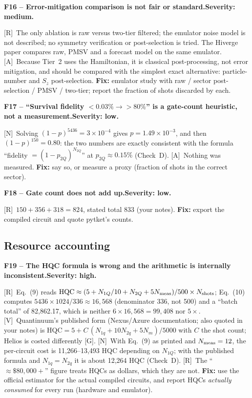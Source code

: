 \documentclass[11pt,a4paper]{article}
\newcommand{\lR}{\textcolor{keyblue}{[R]}}   %
\newcommand{\lV}{\textcolor{keyblue}{[V]}}   %
\newcommand{\lA}{\textcolor{notegray}{[A]}}  %
\newcommand{\lG}{\textcolor{alertred}{[G]}}  %
\newcommand{\lN}{\textcolor{keyblue}{[N]}}   %
\newcommand{\sev}[1]{\textbf{Severity: #1.}}
\newcommand{\flaw}[4]{\par\medskip\noindent\textbf{#1 -- #2.}\quad{\small\textcolor{notegray}{Where: #3.}}\quad\sev{#4}\par\nobreak}
\begin{document}
\flaw{F16}{Error-mitigation comparison is not fair or standard}{p.~9, Sec.~3.5; p.~10}{medium}
\lR\ The only ablation is raw versus two-tier filtered; the emulator noise model is not described; no symmetry verification or post-selection is tried. The Hiverge paper compares raw, PMSV and a forecast model on the same emulator. \lA\ Because Tier~2 uses the Hamiltonian, it is classical post-processing, not error mitigation, and should be compared with the simplest exact alternative: particle-number and $S_z$ post-selection. \textbf{Fix:} emulator study with raw / sector post-selection / PMSV / two-tier; report the fraction of shots discarded by each.

\flaw{F17}{``Survival fidelity $<0.03\%\to>80\%$'' is a gate-count heuristic, not a measurement}{abstract; p.~8; p.~13}{low}
\lN\ Solving $(1-p)^{5436}=3\times10^{-4}$ gives $p=1.49\times10^{-3}$, and then $(1-p)^{150}=0.80$: the two numbers are exactly consistent with the formula ``fidelity $=(1-p_{2Q})^{N_{2Q}}$'' at $p_{2Q}\approx0.15\%$ (Check~D). \lA\ Nothing was measured. \textbf{Fix:} say so, or measure a proxy (fraction of shots in the correct sector).

\flaw{F18}{Gate count does not add up}{p.~9, Sec.~4.1}{low}
\lR\ $150+356+318=824$, stated total 833 (your notes). \textbf{Fix:} export the compiled circuit and quote pytket's counts.

\subsection{Resource accounting}

\flaw{F19}{The HQC formula is wrong and the arithmetic is internally inconsistent}{p.~5, Eqs.~(9)--(10)}{high}
\lR\ Eq.~(9) reads $\mathrm{HQC}\approx(5+N_{1Q}/10+N_{2Q}+5N_{\rm meas})/500\times N_{\rm shots}$; Eq.~(10) computes $5436\times1024/336\approx16{,}568$ (denominator 336, not 500) and a ``batch total'' of 82,862.17, which is neither $6\times16{,}568=99{,}408$ nor $5\times$. \lV\ Quantinuum's published form (Nexus/Azure documentation; also quoted in your notes) is $\mathrm{HQC}=5+C\,(N_{1q}+10N_{2q}+5N_m)/5000$ with $C$ the shot count; Helios is costed differently \lG. \lN\ With Eq.~(9) as printed and $N_{\rm meas}=12$, the per-circuit cost is 11,266--13,493 HQC depending on $N_{1Q}$; with the published formula and $N_{1q}=N_{2q}$ it is about 12,264 HQC (Check~D). \lR\ The ``$\approx\$80{,}000+$'' figure treats HQCs as dollars, which they are not. \textbf{Fix:} use the official estimator for the actual compiled circuits, and report HQCs \emph{actually consumed} for every run (hardware and emulator).
\end{document}
